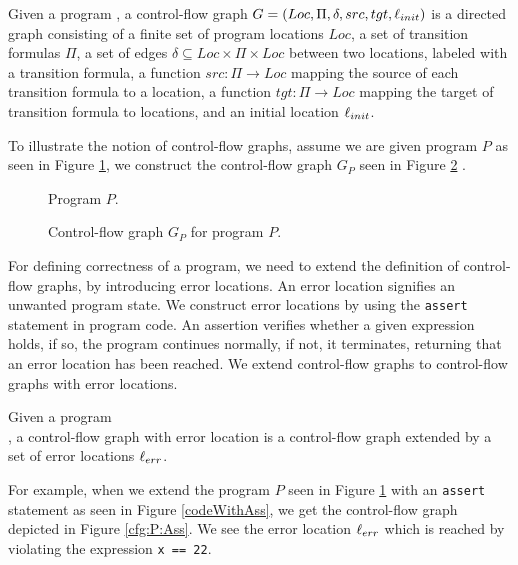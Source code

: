  \begin{mydef}
 	Given a program \prg, a control-flow graph $G = (Loc, \Pi, \delta, src, tgt, \ell_{init})$ is a directed graph consisting of a finite set of program locations $Loc$, a set of transition formulas $\Pi$, a set of edges $\delta \subseteq Loc \times \Pi \times Loc$ between two locations, labeled with a transition formula, a function $src: \Pi \rightarrow Loc$ mapping the source of each transition formula to a location, a function $tgt: \Pi \rightarrow Loc$ mapping the target of transition formula to locations, and an initial location $\ell_{init}$. 
 \end{mydef}
To illustrate the notion of control-flow graphs, assume we are given program $P$ as seen in Figure \ref{codeNoAss}, we construct the control-flow graph $G_P$ seen in Figure \ref{cfg:P:Noass}
.\begin{center}
	\begin{minipage}[b]{0.4\linewidth}
		\begin{figure}[H]
			\centering
			
			\caption{Program $P$.}
			\label{codeNoAss}
		\end{figure}
	\end{minipage}
	\hfill
	\begin{minipage}[b]{0.59\linewidth}
		\begin{figure}[H]
			\centering
			
			\caption{Control-flow graph $G_P$ for program $P$.}
			\label{cfg:P:Noass}
		\end{figure}
	\end{minipage}
\end{center}
For defining correctness of a program, we need to extend the definition of control-flow graphs, by introducing error locations. An error location signifies an unwanted program state. We construct error locations by using the \texttt{assert} statement in program code. An assertion verifies whether a given expression holds, if so, the program continues normally, if not, it terminates, returning that an error location has been reached. We extend control-flow graphs to control-flow graphs with error locations.
 \begin{mydef}
	Given a program \\ \prg, a control-flow graph with error location \cfg is a control-flow graph extended by a set of error locations $\ell_{err}$.
\end{mydef}
For example, when we extend the program $P$ seen in Figure \ref{codeNoAss} with an \texttt{assert} statement as seen in Figure \ref{codeWithAss}, we get the control-flow graph depicted in Figure \ref{cfg:P:Ass}. We see the error location $\ell_{err}$ which is reached by violating the expression \texttt{x == 22}.
